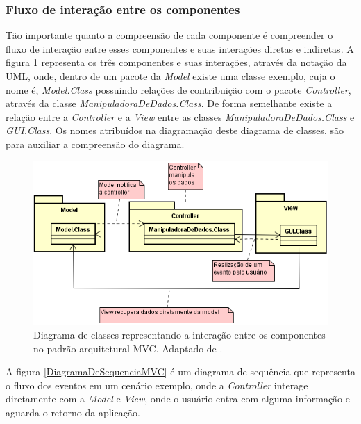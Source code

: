 \subsubsection{Fluxo de interação entre os componentes}

Tão importante quanto a compreensão de cada componente é compreender o fluxo de interação entre esses componentes e suas interações diretas e indiretas. A figura \ref{DiagramaDeClasseMVC} representa os três componentes e suas interações, através da notação da UML, onde, dentro de um pacote da \textit{Model} existe uma classe exemplo, cuja o nome é, \textit{Model.Class} possuindo relações de contribuição com o pacote \textit{Controller}, através da classe \textit{ManipuladoraDeDados.Class}. De forma semelhante existe a relação entre a \textit{Controller} e a \textit{View} entre as classes  \textit{ManipuladoraDeDados.Class} e \textit{GUI.Class}. Os nomes atribuídos na diagramação deste diagrama de classes, são para auxiliar a compreensão do diagrama. 

\begin{figure}[h!]
	\centering
	\includegraphics[keepaspectratio=true,scale=0.9]{figuras/DiagramaDeClasseMVC.PNG}
	\caption{Diagrama de classes representando a interação entre os componentes no padrão arquitetural MVC. Adaptado de \cite{durelli2008proposta}.}
	\label{DiagramaDeClasseMVC}
\end{figure}

\pagebreak

A figura \ref{DiagramaDeSequenciaMVC} é um diagrama de sequência que representa o fluxo dos eventos em um cenário exemplo, onde a \textit{Controller} interage diretamente com a \textit{Model} e \textit{View}, onde o usuário entra com alguma informação e aguarda o retorno da aplicação. 


